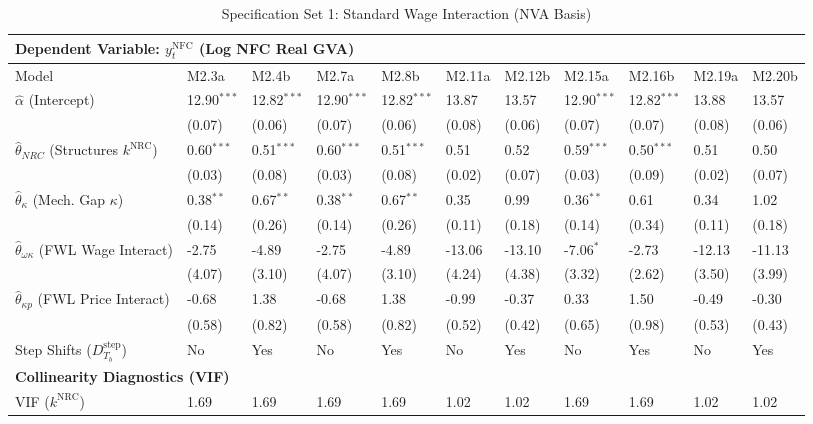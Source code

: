 \begin{table}[H]
\centering
\setlength{\tabcolsep}{1.5pt}
\caption{Specification Set 1: Standard Wage Interaction (NVA Basis)}
\label{tab:specB_set1_nva}
\tiny
\begin{tabular}{p{3.5cm}p{1.0cm}p{1.0cm}p{1.0cm}p{1.0cm}p{1.0cm}p{1.0cm}p{1.0cm}p{1.0cm}p{1.0cm}p{1.0cm}}
\toprule
\multicolumn{11}{l}{\textbf{Dependent Variable: $y_t^{\text{NFC}}$ (Log NFC Real GVA)}} \\
\midrule
Model & M2.3a & M2.4b & M2.7a & M2.8b & M2.11a & M2.12b & M2.15a & M2.16b & M2.19a & M2.20b \\
\midrule
$\hat{\alpha}$ (Intercept) & 12.90$^{***}$ & 12.82$^{***}$ & 12.90$^{***}$ & 12.82$^{***}$ & 13.87 & 13.57 & 12.90$^{***}$ & 12.82$^{***}$ & 13.88 & 13.57 \\
 & (0.07) & (0.06) & (0.07) & (0.06) & (0.08) & (0.06) & (0.07) & (0.07) & (0.08) & (0.06) \\
$\hat{\theta}_{NRC}$ (Structures $k^{\text{NRC}}$) & 0.60$^{***}$ & 0.51$^{***}$ & 0.60$^{***}$ & 0.51$^{***}$ & 0.51 & 0.52 & 0.59$^{***}$ & 0.50$^{***}$ & 0.51 & 0.50 \\
 & (0.03) & (0.08) & (0.03) & (0.08) & (0.02) & (0.07) & (0.03) & (0.09) & (0.02) & (0.07) \\
$\hat{\theta}_{\kappa}$ (Mech. Gap $\kappa$) & 0.38$^{**}$ & 0.67$^{**}$ & 0.38$^{**}$ & 0.67$^{**}$ & 0.35 & 0.99 & 0.36$^{**}$ & 0.61 & 0.34 & 1.02 \\
 & (0.14) & (0.26) & (0.14) & (0.26) & (0.11) & (0.18) & (0.14) & (0.34) & (0.11) & (0.18) \\
$\hat{\theta}_{\omega\kappa}$ (FWL Wage Interact) & -2.75 & -4.89 & -2.75 & -4.89 & -13.06 & -13.10 & -7.06$^{*}$ & -2.73 & -12.13 & -11.13 \\
 & (4.07) & (3.10) & (4.07) & (3.10) & (4.24) & (4.38) & (3.32) & (2.62) & (3.50) & (3.99) \\
$\hat{\theta}_{\kappa p}$ (FWL Price Interact) & -0.68 & 1.38 & -0.68 & 1.38 & -0.99 & -0.37 & 0.33 & 1.50 & -0.49 & -0.30 \\
 & (0.58) & (0.82) & (0.58) & (0.82) & (0.52) & (0.42) & (0.65) & (0.98) & (0.53) & (0.43) \\
Step Shifts ($D_{T_b}^{\text{step}}$) & No & Yes & No & Yes & No & Yes & No & Yes & No & Yes \\
\midrule
\multicolumn{11}{l}{\textbf{Collinearity Diagnostics (VIF)}} \\
VIF ($k^{\text{NRC}}$) & 1.69 & 1.69 & 1.69 & 1.69 & 1.02 & 1.02 & 1.69 & 1.69 & 1.02 & 1.02 \\

\end{tabular}
\end{table}
